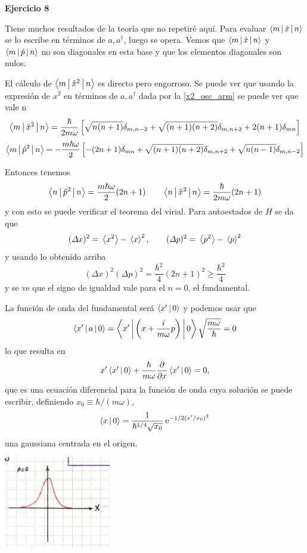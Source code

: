 \documentclass[10pt,oneside]{CBFT_book}
\begin{document}
\begin{ejemplo}{\bf Ejercicio 8}

Tiene muchos resultados de la teoría que no repetiré aquí.
Para evaluar $\Braket{m|\hat{x}|n}$ se lo escribe en términos de $a, a^\dagger$, luego se opera.
Vemos que $\Braket{m|\hat{x}|n}$ y $\Braket{m|\hat{p}|n}$ no son diagonales en esta base y que
los elementos diagonales son nulos.

El cálculo de $\Braket{m|\hat{x}^2|n}$ es directo pero engorroso. Se puede ver que usando la
expresión de $x^2$ en términos de $a, a^\dagger$ dada por la \eqref{x2_osc_arm} se puede ver que
vale n
\[
	\Braket{m|\hat{x}^2|n} = \frac{\hbar }{2 m \omega}
	\left[ 
	\sqrt{n(n+1)} \delta_{m,n-2} + \sqrt{(n+1)(n+2)} \delta_{m,n+2} + 2(n+1)\delta_{mn}
	\right]
\]
\[
	\Braket{m|\hat{p}^2|n} = - \frac{m \hbar \omega }{2}
	\left[ 
	-(2n+1) \delta_{mn} + \sqrt{(n+1)(n+2)} \delta_{m,n+2} + \sqrt{n(n-1)}\delta_{m,n-2}
	\right]
\]

Entonces tenemos
\[
	\Braket{n|\hat{p}^2|n} = \frac{m \hbar \omega }{2} ( 2n + 1 )
	\qquad 
	\Braket{n|\hat{x}^2|n} = \frac{\hbar}{2 m \omega} ( 2n + 1 )
\]
y con esto se puede verificar el teorema del virial.
Para autoestados de $H$ se da que 
\[
	(\Delta x)^2 = \:\left\langle x^2 \right\rangle - \:\left\langle x \right\rangle^2, \qquad 
	(\Delta p)^2 = \:\left\langle p^2 \right\rangle - \:\left\langle p \right\rangle^2
\]
y usando lo obtenido arriba
\[
	(\Delta x)^2 (\Delta p)^2 = \frac{\hbar^2}{4}(2n+1)^2 \geq \frac{\hbar^2}{4}
\]
y se ve que el signo de igualdad vale para el $n=0$, el fundamental.

La función de onda del fundamental será $\Braket{x'|0}$ y podemos usar que
\[
	\Braket{x'|a|0} = \Braket{x'| \left( x + \frac{i}{m\omega} p \right)|0} 
	\sqrt{\frac{m\omega}{\hbar}} = 0
\]
lo que resulta en
\[
	x' \Braket{x'| 0} + \frac{\hbar}{m\omega} \frac{\partial^{\hspace{-0.05em}} {}}{\partial {x}^{\hspace{-0.05em}}} \Braket{x'|0} = 0,
\]
que es una ecuación diferencial para la función de onda 
cuya solución se puede escribir, definiendo $x_0 \equiv \hbar / (m\omega) $,
\[
	\Braket{x|0} = \frac{1}{\hbar^{1/4} \sqrt{x_0}} \:\mathrm{e}^{-1/2 (x'/x_0)^2}
\]
una gaussiana centrada en el origen.

\includegraphics[width=0.35\textwidth]{images/fig_ft2_osc_arm_gaussiana.jpg}


\end{ejemplo}
\end{document}
